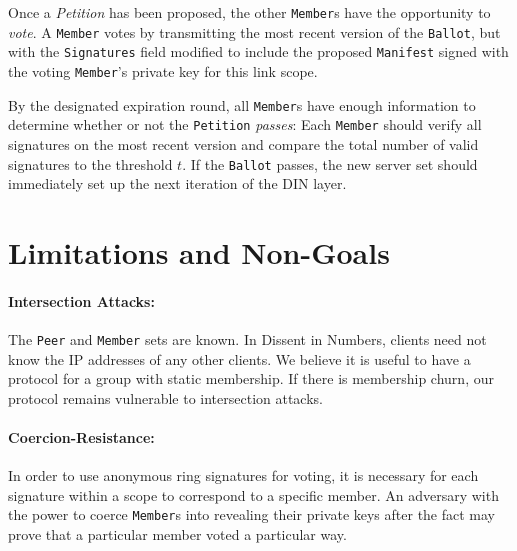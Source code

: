 Once a \emph{Petition} has been proposed, the other \texttt{Member}s have the
opportunity to \emph{vote}. A \texttt{Member} votes by transmitting the most
recent version of the \texttt{Ballot}, but with the \texttt{Signatures} field
modified to include the proposed \texttt{Manifest} signed with the voting
\texttt{Member}'s private key for this link scope.

By the designated expiration round, all \texttt{Member}s have enough
information to determine whether or not the \texttt{Petition} \emph{passes}:
Each \texttt{Member} should verify all signatures on the most recent
version
and compare the total number of valid signatures to the threshold $t$. If the
\texttt{Ballot} passes, the new server set should immediately set up the
next iteration of the DIN layer.

\section{Limitations and Non-Goals}
  \paragraph{Intersection Attacks:} The \texttt{Peer} and \texttt{Member} sets are known. In Dissent in
    Numbers, clients need not know the IP addresses of any other clients. We
    believe it is useful to have a protocol for a group with static membership.
    If there is membership churn, our protocol remains vulnerable to
    intersection attacks.
  \paragraph{Coercion-Resistance:} In order to use anonymous ring signatures for voting, it is necessary
    for each signature within a scope to correspond to a specific member. An
    adversary with the power to coerce \texttt{Member}s into revealing their
    private keys after the fact may prove that a particular member voted a
    particular way\cite{lrs}.
